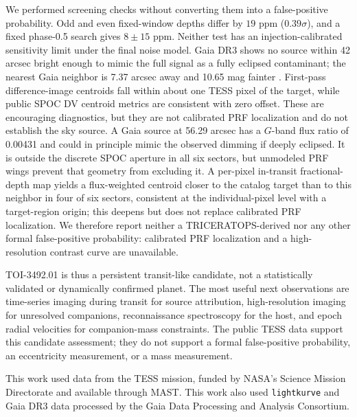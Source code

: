 \documentclass[rnaas]{aastex701}
\begin{document}
We performed screening checks without converting them into a false-positive
probability. Odd and even fixed-window depths differ by $19$ ppm ($0.39\sigma$),
and a fixed phase-0.5 search gives $8\pm15$ ppm. Neither test has an
injection-calibrated sensitivity limit under the final noise model. Gaia DR3
shows no source within 42 arcsec bright enough to mimic the full signal as a
fully eclipsed contaminant; the nearest Gaia neighbor is 7.37 arcsec away and
10.65 mag fainter \citep{Vallenari2023}. First-pass difference-image centroids
fall within about one TESS pixel of the target, while public SPOC DV centroid
metrics are consistent with zero offset. These are encouraging diagnostics, but
they are not calibrated PRF localization and do not establish the sky source.
A Gaia source at 56.29 arcsec has a $G$-band flux ratio of 0.00431 and could in
principle mimic the observed dimming if deeply eclipsed. It is outside the
discrete SPOC aperture in all six sectors, but unmodeled PRF wings prevent that
geometry from excluding it. A per-pixel in-transit fractional-depth map yields a
flux-weighted centroid closer to the catalog target than to this neighbor in
four of six sectors, consistent at the individual-pixel level with a
target-region origin; this deepens but does not replace calibrated PRF
localization. We therefore report neither a TRICERATOPS-derived nor any other
formal false-positive probability: calibrated PRF localization and a
high-resolution contrast curve are unavailable.

TOI-3492.01 is thus a persistent transit-like candidate, not a statistically
validated or dynamically confirmed planet. The most useful next observations are
time-series imaging during transit for source attribution, high-resolution
imaging for unresolved companions, reconnaissance spectroscopy for the host, and
epoch radial velocities for companion-mass constraints. The public TESS data
support this candidate assessment; they do not support a formal false-positive
probability, an eccentricity measurement, or a mass measurement.

\begin{acknowledgments}
This work used data from the TESS mission, funded by NASA's Science Mission
Directorate and available through MAST. This work also used \texttt{lightkurve}
and Gaia DR3 data processed by the Gaia Data Processing and Analysis Consortium.
\end{acknowledgments}




\end{document}

